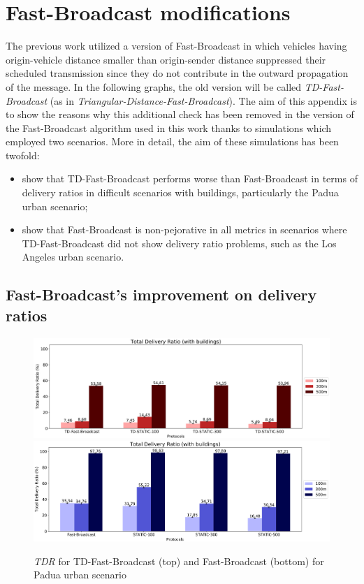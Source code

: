 
\chapter{Fast-Broadcast modifications}
	\label{chapter:fbmod}
	The previous work \cite{ROM2017} utilized a version of Fast-Broadcast in which vehicles having origin-vehicle distance smaller than origin-sender distance suppressed their scheduled transmission since they do not contribute in the outward propagation of the message. In the following graphs, the old version will be called \textit{TD-Fast-Broadcast} (as in \textit{Triangular-Distance-Fast-Broadcast}). The aim of this appendix is to show the reasons why this additional check has been removed in the version of the Fast-Broadcast algorithm used in this work thanks to simulations which employed two scenarios. More in detail, the aim of these simulations has been twofold:
	\begin{itemize}
		\item show that TD-Fast-Broadcast performs worse than Fast-Broadcast in terms of delivery ratios in difficult scenarios with buildings, particularly the Padua urban scenario;
		\item show that Fast-Broadcast is non-pejorative in all metrics in scenarios where TD-Fast-Broadcast did not show delivery ratio problems, such as the Los Angeles urban scenario.
	\end{itemize}

	\section{Fast-Broadcast's improvement on delivery ratios}
		\begin{figure}[H]
			\centering
			\includegraphics[width=1.0\textwidth]{immagini/td-fb-pd/td-fb/tdr}
			\includegraphics[width=1.0\textwidth]{immagini/td-fb-pd/fb/tdr}
			\caption{\textit{TDR} for TD-Fast-Broadcast (top) and Fast-Broadcast (bottom) for Padua urban scenario}
			\label{fig:td-tdr}
		\end{figure}
	
